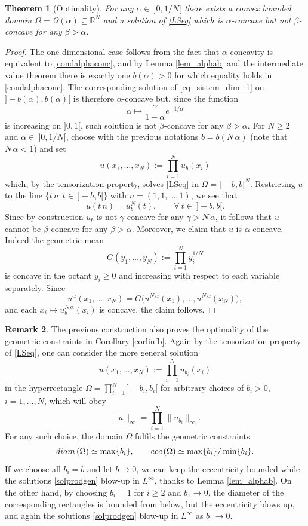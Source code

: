 \documentclass[12pt]{amsart}
\numberwithin{equation}{section}
\newtheorem{theorem}{Theorem}[section]
\theoremstyle{plain}
\theoremstyle{plain}
\theoremstyle{plain}
\theoremstyle{definition}
\newtheorem{remark}[theorem]{Remark}
\newcommand{\R}{{\mathbb R}}
\newcommand{\beq}{\begin{equation}}
\newcommand{\eeq}{\end{equation}}
\renewcommand{\ge}{\geqslant}
\begin{document}
\begin{theorem}[Optimality]\label{opt_thm}
 For any $\alpha\in\ ]0, 1/N[$ there exists a convex bounded domain $\Omega=\Omega(\alpha)\subseteq \R^N$ and a solution of \eqref{LSeq} which is $\alpha$-concave but not $\beta$-concave for any $\beta>\alpha$.
\end{theorem}

\begin{proof}
The one-dimensional case follows from the fact that $\alpha$-concavity is equivalent to \eqref{condalphaconc}, and by Lemma \ref{lem_alphab} and the intermediate value theorem there is exactly one $b(\alpha)>0$ for which equality holds in \eqref{condalphaconc}. 
The corresponding solution of \eqref{eq_sistem_dim_1} on $]-b(\alpha), b(\alpha)[$ is therefore $\alpha$-concave but, since the function
\[
\alpha\mapsto \frac{\alpha}{1-\alpha} e^{-1/\alpha}
\]
is increasing on $]0, 1[$, such solution is not $\beta$-concave for any $\beta>\alpha$. 
For $N\ge 2$ and $\alpha\in \ ]0, 1/N[$, choose with the previous notations $b=b(N\, \alpha)$ (note that $N\, \alpha<1$) and set
\[
u(x_1, \dots, x_N):=\prod_{i=1}^N u_b(x_i)
\]
which, by the tensorization property, solves \eqref{LSeq} in $\Omega=]-b, b[^N$. 
Restricting $u$ to the line $\{t\, n:t\in\ ]-b, b[ \}$ with $n= (1, 1, \dots, 1)$, we see that
\[
u(t\, n)=u_b^N(t), \qquad \forall\ t\in \ ]-b, b[.
\]
Since by construction $u_b$ is not $\gamma$-concave for any $\gamma>N\, \alpha$, it follows that $u$ cannot be $\beta$-concave for any $\beta>\alpha$. Moreover, we claim that $u$ is $\alpha$-concave. 
Indeed the geometric mean 
\[
 G(y_1, \dots, y_N):=\prod_{i=1}^N y_i^{1/N}
\]
 is concave in the octant $y_i\ge 0$ and increasing with respect to each variable separately. Since 
 \[
 u^\alpha(x_1, \dots, x_N)=G\big(u^{N\, \alpha}(x_1), \dots, u^{N\, \alpha}(x_N)\big), 
 \]
and each $x_i\mapsto u_b^{N\, \alpha}(x_i)$ is concave, the claim follows.
\end{proof}

\begin{remark}
\label{optbounds}
The previous construction also proves the optimality of the geometric constraints in Corollary \ref{corlinfb}. 
Again by the tensorization property of \eqref{LSeq}, one can consider the more general solution
\beq
\label{solprodgen}
u(x_1, \dots, x_N):=\prod_{i=1}^N u_{b_i}(x_i)
\eeq
in the hyperrectangle $\Omega=\prod_{i=1}^N ]-b_i, b_i[$ for arbitrary choices of $b_i>0$, $i=1, \dots, N$, which will obey 
\[
\|u\|_\infty=\prod_{i=1}^N \|u_{b_i}\|_\infty.
\]
For any such choice, the domain $\Omega$ fulfils the geometric constraints
\[
{\rm diam}\, (\Omega)\simeq \max\{b_i\}, \qquad {\rm ecc}\, (\Omega)\simeq \max\{b_i\}/\min\{b_i\}.
\]
If we choose all $b_i=b$ and let $b\to 0$, we can keep the eccentricity bounded while the solutions \eqref{solprodgen} blow-up in $L^\infty$, thanks to Lemma \ref{lem_alphab}. 
On the other hand, by choosing $b_i=1$ for $i\ge 2$ and $b_1\to 0$, the diameter of the corresponding rectangles is bounded from below, but the eccentricity blows up, and again the solutions \eqref{solprodgen} blow-up in $L^\infty$ as $b_1\to 0$.
\end{remark}
\end{document}
